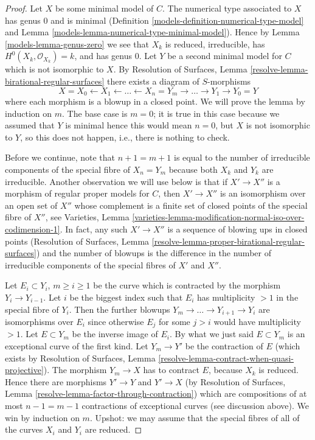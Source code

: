 \begin{proof}

Let $X$ be some minimal model of $C$. The numerical type associated to $X$
has genus $0$ and is minimal (Definition \ref{models-definition-numerical-type-model}
and Lemma \ref{models-lemma-numerical-type-minimal-model}).
Hence by Lemma \ref{models-lemma-genus-zero} we see that
$X_k$ is reduced, irreducible, has $H^0(X_k, \mathcal{O}_{X_k}) = k$,
and has genus $0$. Let $Y$ be a second minimal model for $C$
which is not isomorphic to $X$. By
Resolution of Surfaces, Lemma \ref{resolve-lemma-birational-regular-surfaces}
there exists a diagram of $S$-morphisms
$$
X = X_0 \leftarrow X_1 \leftarrow \ldots \leftarrow X_n = Y_m
\to \ldots \to Y_1 \to Y_0 = Y
$$
where each morphism is a blowup in a closed point. We will prove the
lemma by induction on $m$. The base case is $m = 0$; it is
true in this case because we assumed that $Y$ is minimal
hence this would mean $n = 0$, but $X$ is not isomorphic
to $Y$, so this does not happen, i.e., there is nothing to check.

\medskip\noindent
Before we continue, note that $n + 1 = m + 1$ is equal to the number of
irreducible components of the special fibre of $X_n = Y_m$ because
both $X_k$ and $Y_k$ are irreducible. Another observation we
will use below is that if $X' \to X''$ is a morphism
of regular proper models for $C$, then $X' \to X''$ is an isomorphism
over an open set of $X''$ whose complement is a finite set
of closed points of the special fibre of $X''$, see
Varieties, Lemma
\ref{varieties-lemma-modification-normal-iso-over-codimension-1}.
In fact, any such $X' \to X''$ is a sequence
of blowing ups in closed points (Resolution of Surfaces, Lemma
\ref{resolve-lemma-proper-birational-regular-surfaces}) and the
number of blowups is the difference in the number of irreducible
components of the special fibres of $X'$ and $X''$.

\medskip\noindent
Let $E_i \subset Y_i$, $m \geq i \geq 1$ be the curve which is contracted
by the morphism $Y_i \to Y_{i - 1}$. Let $i$ be the biggest index such
that $E_i$ has multiplicity $> 1$ in the special fibre of $Y_i$.
Then the further blowups $Y_m \to \ldots \to Y_{i + 1} \to Y_i$
are isomorphisms over $E_i$ since otherwise $E_j$ for some $j > i$
would have multiplicity $> 1$. Let $E \subset Y_m$ be the inverse
image of $E_i$. By what we just said $E \subset Y_m$ is an
exceptional curve of the first kind. Let $Y_m \to Y'$ be the
contraction of $E$ (which exists by Resolution of Surfaces, Lemma
\ref{resolve-lemma-contract-when-quasi-projective}). The morphism
$Y_m \to X$ has to contract $E$, because $X_k$ is reduced.
Hence there are morphisms $Y' \to Y$ and $Y' \to X$ (by
Resolution of Surfaces, Lemma
\ref{resolve-lemma-factor-through-contraction})
which are compositions of at most $n - 1 = m - 1$ contractions
of exceptional curves (see discussion above). We win by induction on $m$.
Upshot: we may assume that the special fibres of all of
the curves $X_i$ and $Y_i$ are reduced.


\end{proof}
